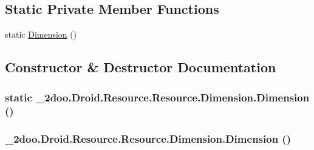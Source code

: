 \subsection*{Static Private Member Functions}
\begin{CompactItemize}
\item 
static \hyperlink{class__2doo_1_1_droid_1_1_resource_1_1_dimension_ab5b6545fe11dbcff015d253ab08e5c1}{Dimension} ()
\end{CompactItemize}


\subsection{Constructor \& Destructor Documentation}
\hypertarget{class__2doo_1_1_droid_1_1_resource_1_1_dimension_ab5b6545fe11dbcff015d253ab08e5c1}{
\subsubsection[{Dimension}]{\setlength{\rightskip}{0pt plus 5cm}static \_\-2doo.Droid.Resource.Resource.Dimension.Dimension ()}}
\label{class__2doo_1_1_droid_1_1_resource_1_1_dimension_ab5b6545fe11dbcff015d253ab08e5c1}


\hypertarget{class__2doo_1_1_droid_1_1_resource_1_1_dimension_daae10d0dc9738b47afe3cd46de794bd}{
\subsubsection[{Dimension}]{\setlength{\rightskip}{0pt plus 5cm}\_\-2doo.Droid.Resource.Resource.Dimension.Dimension ()}}
\label{class__2doo_1_1_droid_1_1_resource_1_1_dimension_daae10d0dc9738b47afe3cd46de794bd}




